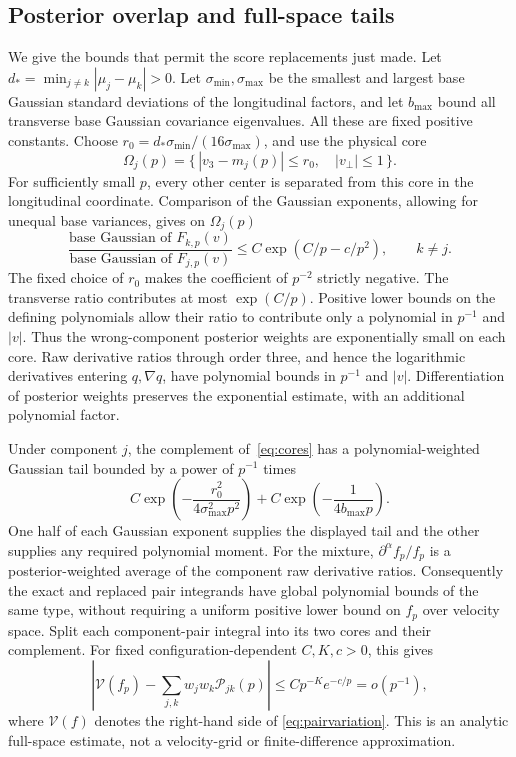 \documentclass[11pt]{article}
\numberwithin{equation}{section}
\begin{document}
\subsection{Posterior overlap and full-space tails}
We give the bounds that permit the score replacements just made.
Let \(d_* =\min_{j\ne k}|\mu_j-\mu_k|>0\). Let
\(\sigma_{\min},\sigma_{\max}\) be the smallest and largest base
Gaussian standard deviations of the longitudinal factors, and let
\(b_{\max}\) bound all transverse base Gaussian covariance eigenvalues.
All these are fixed positive constants. Choose
\(r_0=d_*\sigma_{\min}/(16\sigma_{\max})\), and use the physical
core
\begin{equation}\label{eq:cores}
 \Omega_j(p)=\{\,|v_3-m_j(p)|\leq r_0,\quad |v_\perp|\leq1\,\}.
\end{equation}
For sufficiently small \(p\), every other center is separated from
this core in the longitudinal coordinate. Comparison of the Gaussian
exponents, allowing for unequal base variances, gives on \(\Omega_j(p)\)
\[
 \frac{\text{base Gaussian of }F_{k,p}(v)}
      {\text{base Gaussian of }F_{j,p}(v)}
       \leq C\exp(C/p-c/p^2),\qquad k\ne j.
\]
The fixed choice of \(r_0\) makes the coefficient of \(p^{-2}\)
strictly negative. The transverse ratio contributes at most
\(\exp(C/p)\). Positive lower bounds on the defining polynomials
allow their ratio to contribute only a polynomial in \(p^{-1}\) and
\(|v|\). Thus the wrong-component posterior weights are exponentially
small on each core. Raw derivative ratios through order three, and hence
the logarithmic derivatives entering \(q,\nabla q\), have polynomial
bounds in \(p^{-1}\) and \(|v|\). Differentiation of posterior weights
preserves the exponential estimate, with an additional polynomial factor.

Under component \(j\), the complement of~\eqref{eq:cores} has a
polynomial-weighted Gaussian tail bounded by a power of \(p^{-1}\)
times
\begin{equation}\label{eq:tails}
 C\exp\!\left(-\frac{r_0^2}{4\sigma_{\max}^2p^2}\right)
       +C\exp\!\left(-\frac1{4b_{\max}p}\right).
\end{equation}
One half of each Gaussian exponent supplies the displayed tail and
the other supplies any required polynomial moment. For the mixture,
\(\partial^\alpha f_p/f_p\) is a posterior-weighted average of the
component raw derivative ratios. Consequently the exact and replaced
pair integrands have global polynomial bounds of the same type, without
requiring a uniform positive lower bound on \(f_p\) over velocity space.
Split each component-pair integral into its two cores and their
complement. For fixed configuration-dependent \(C,K,c>0\), this gives
\begin{equation}\label{eq:overlap}
 \left|\mathcal V(f_p)-\sum_{j,k}w_jw_k\mathcal P_{jk}(p)\right|
       \leq Cp^{-K}e^{-c/p}=o(p^{-1}),
\end{equation}
where \(\mathcal V(f)\) denotes the right-hand side of
\eqref{eq:pairvariation}. This is an analytic full-space estimate,
not a velocity-grid or finite-difference approximation.
\end{document}
